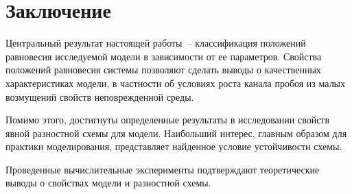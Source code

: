 
\section{Заключение}

Центральный результат настоящей работы~-- классификация положений равновесия исследуемой модели в зависимости от ее параметров. Свойства положений равновесия системы позволяют сделать выводы о качественных характеристиках модели, в частности об условиях роста канала пробоя из малых возмущений свойств неповрежденной среды.

Помимо этого, достигнуты определенные результаты в исследовании \linebreak свойств явной разностной схемы для модели. Наибольший интерес, главным образом для практики моделирования, представляет найденное условие устойчивости схемы.

Проведенные вычислительные эксперименты подтверждают теоретические выводы о свойствах модели и разностной схемы.